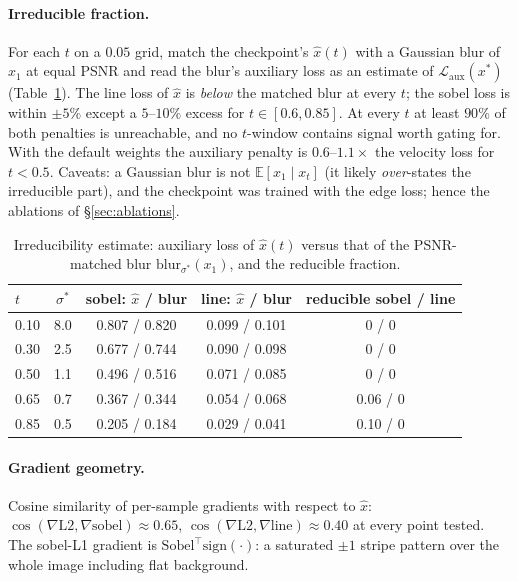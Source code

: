 \documentclass[11pt]{article}
\newcommand{\E}{\mathbb{E}}
\newcommand{\xh}{\hat{x}}
\begin{document}
\paragraph{Irreducible fraction.} For each $t$ on a $0.05$ grid, match the checkpoint's
$\xh(t)$ with a Gaussian blur of $x_1$ at equal PSNR and read the blur's auxiliary loss
as an estimate of $\mathcal L_{\text{aux}}(x^*)$ (Table~\ref{tab:gate}). The line loss of
$\xh$ is \emph{below} the matched blur at every $t$; the sobel loss is within $\pm5\%$
except a $5$--$10\%$ excess for $t\in[0.6,0.85]$. At every $t$ at least $90\%$ of both
penalties is unreachable, and no $t$-window contains signal worth gating for. With the
default weights the auxiliary penalty is $0.6$--$1.1\times$ the velocity loss for
$t<0.5$. Caveats: a Gaussian blur is not $\E[x_1\mid x_t]$ (it likely \emph{over}-states
the irreducible part), and the checkpoint was trained with the edge loss; hence the
ablations of \S\ref{sec:ablations}.

\begin{table}[t]
\centering\small
\caption{Irreducibility estimate: auxiliary loss of $\xh(t)$ versus that of the
PSNR-matched blur $\text{blur}_{\sigma^*}(x_1)$, and the reducible fraction.}
\label{tab:gate}
\begin{tabular}{lcccc}
\toprule
$t$ & $\sigma^*$ & sobel: $\xh$ / blur & line: $\xh$ / blur & reducible sobel / line \\
\midrule
0.10 & 8.0 & 0.807 / 0.820 & 0.099 / 0.101 & 0 / 0 \\
0.30 & 2.5 & 0.677 / 0.744 & 0.090 / 0.098 & 0 / 0 \\
0.50 & 1.1 & 0.496 / 0.516 & 0.071 / 0.085 & 0 / 0 \\
0.65 & 0.7 & 0.367 / 0.344 & 0.054 / 0.068 & 0.06 / 0 \\
0.85 & 0.5 & 0.205 / 0.184 & 0.029 / 0.041 & 0.10 / 0 \\
\bottomrule
\end{tabular}
\end{table}

\paragraph{Gradient geometry.} Cosine similarity of per-sample gradients with respect
to $\xh$: $\cos(\nabla\text{L2},\nabla\text{sobel})\approx0.65$,
$\cos(\nabla\text{L2},\nabla\text{line})\approx0.40$ at every point tested. The sobel-L1
gradient is $\text{Sobel}^\top\mathrm{sign}(\cdot)$: a saturated $\pm1$ stripe pattern
over the whole image including flat background.
\end{document}
